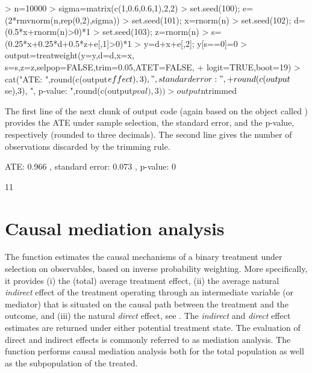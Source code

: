 \documentclass[nojss]{jss}
\begin{document}
\begin{Schunk}
\begin{Sinput}
> n=10000
> sigma=matrix(c(1,0.6,0.6,1),2,2)
> set.seed(100); e=(2*rmvnorm(n,rep(0,2),sigma))
> set.seed(101); x=rnorm(n)
> set.seed(102); d=(0.5*x+rnorm(n)>0)*1
> set.seed(103); z=rnorm(n)
> s=(0.25*x+0.25*d+0.5*z+e[,1]>0)*1
> y=d+x+e[,2]; y[s==0]=0
> output=treatweight(y=y,d=d,x=x, s=s,z=z,selpop=FALSE,trim=0.05,ATET=FALSE,
+                    logit=TRUE,boot=19)
> cat("ATE: ",round(c(output$effect),3),", standard error: ",
+     round(c(output$se),3), ", p-value: ",round(c(output$pval),3))
> output$ntrimmed
\end{Sinput}
\end{Schunk}

The first line of the next chunk of output code (again based on the  object called ) provides the ATE under sample selection, the standard error, and the p-value, respectively (rounded to three decimals). The second line gives the number of observations discarded by the trimming rule.

\begin{Schunk}
\begin{Soutput}
ATE:  0.966 , standard error:  0.073 , p-value:  0
\end{Soutput}
\begin{Soutput}
[1] 11
\end{Soutput}
\end{Schunk}

\section{Causal mediation analysis}\label{mediation}

The function  estimates the causal mechanisms of a binary treatment under selection on observables, based on inverse probability weighting. More specifically, it provides (i) the (total) average treatment effect, (ii) the average natural \emph{indirect} effect of the treatment operating through an intermediate variable (or mediator) that is situated on the causal path between the treatment and the outcome, and (iii) the natural \emph{direct} effect, see \citet{Hu2014}. The \emph{indirect} and \emph{direct} effect estimates are returned under either potential treatment state. The evaluation of direct and indirect effects is commonly referred to as mediation analysis. The function  performs causal mediation analysis both for the total population as well as the subpopulation of the treated.
\end{document}
